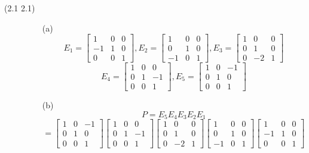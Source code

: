 \begin{description}
\item[(2.1 {\color{cBlue}2.1})]
\begin{itemize}
\item[(a)]
$$E_1 = \begin{bmatrix}
1 & 0 & 0 \\
-1 & 1 & 0 \\
0 & 0 & 1
\end{bmatrix}, E_2 = \begin{bmatrix}
1 & 0 & 0 \\
0 & 1 & 0 \\
-1 & 0 & 1
\end{bmatrix}, E_3 = \begin{bmatrix}
1 & 0 & 0 \\
0 & 1 & 0 \\
0 & -2 & 1
\end{bmatrix}$$
$$E_4 = \begin{bmatrix}
1 & 0 & 0 \\
0 & 1 & -1 \\
0 & 0 & 1
\end{bmatrix}, E_5 = \begin{bmatrix}
1 & 0 & -1 \\
0 & 1 & 0 \\
0 & 0 & 1
\end{bmatrix}$$
\item[(b)]
$$P = E_5E_4E_3E_2E_1$$
$$= \begin{bmatrix}
1 & 0 & -1 \\
0 & 1 & 0 \\
0 & 0 & 1
\end{bmatrix}\begin{bmatrix}
1 & 0 & 0 \\
0 & 1 & -1 \\
0 & 0 & 1
\end{bmatrix}\begin{bmatrix}
1 & 0 & 0 \\
0 & 1 & 0 \\
0 & -2 & 1
\end{bmatrix}\begin{bmatrix}
1 & 0 & 0 \\
0 & 1 & 0 \\
-1 & 0 & 1
\end{bmatrix}\begin{bmatrix}
1 & 0 & 0 \\
-1 & 1 & 0 \\
0 & 0 & 1
\end{bmatrix}$$

\end{itemize}
\end{description}
